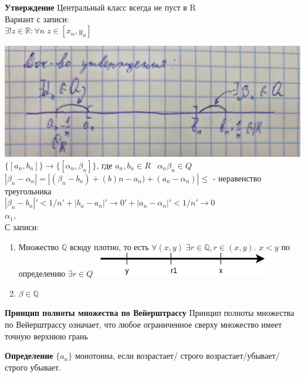 \documentclass[12pt, paper]{article}
\newcommand{\Q}{\mathbb{Q}}
\newcommand{\R}{\mathbb{R}}
\begin{document}
\begin{tcolorbox}
    \textbf{Утверждение}
    Центральный класс всегда не пуст в R\\
    Вариант с записи: \\
    $\exists!z\in\R: \forall n\; z\in [x_n, y_n]$
\end{tcolorbox}

\begin{tcolorbox}[title=Доказательство., breakable]
    \includegraphics[width=0.5\linewidth]{Док-во утверждения об отрезках.png}\\
    $\{ [a_n,b_n] \} \rightarrow \{ [\alpha_n,\beta_n] \}$, где $a_n,b_n \in R\;\;\; \alpha_n\beta_n \in Q$\\
    $|\beta_n - \alpha_n| = |(\beta_n - b_n)+(b)n-a_n)+(a_n-\alpha_n)| \leq$ - неравенство треугольника\\ 
    $|\beta_n-b_n|'<1/n'+|b_n-a_n|'\rightarrow 0' +|a_n-\alpha_n| '<1/n' \rightarrow 0$\\
    $\alpha_1,\ $\\

    С записи:\\
    \begin{enumerate}
        \item Множество $\Q$ всюду плотно, то есть $\forall (x, y)\; \exists r\in \Q, r\in (x, y)$. $x < y$ по определению $\exists r \in Q$ 
        \includegraphics[width=0.5\linewidth]{images/Вложенные отрезки/Доказательство плотность множества Q.png}\\
        \item $\beta \in \Q$
        \end{enumerate}
\end{tcolorbox}

\begin{tcolorbox}
    \textbf{Принцип полноты множества по Вейерштрассу}
    Принцип полноты множества по Вейерштрассу означает, что любое ограниченное сверху множество имеет точную верхнюю грань     
\end{tcolorbox}

\begin{tcolorbox}
    \textbf{Определение}
    $\{a_n\}$ монотонна, если возрастает/ строго возрастает/убывает/строго убывает.
\end{tcolorbox}
\end{document}
